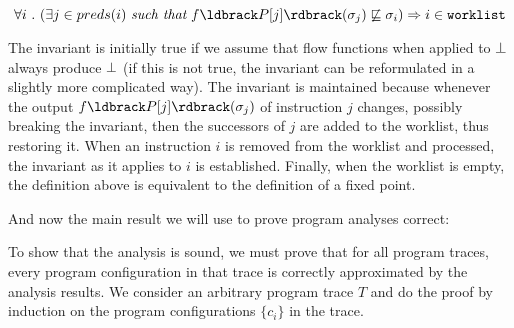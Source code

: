 \documentclass[11pt]{article}
\begin{document}
\[
\forall i ~.~ (\exists j \in preds(i) ~\textit{such that}~f\parg{P[j]}(\sigma_j) \not\alap \sigma_i) \Rightarrow i \in \texttt{worklist}
\]

The invariant is initially true if we assume that flow functions when applied to $\bot$ always produce $\bot$ (if this is not true, the invariant can be reformulated in a slightly more complicated way).  The invariant is maintained because whenever the output $f\parg{P[j]}(\sigma_j)$ of instruction $j$ changes, possibly breaking the invariant, then the successors of $j$ are added to the worklist, thus restoring it.  When an instruction $i$ is removed from the worklist and processed, the invariant as it applies to $i$ is established.  Finally, when the worklist is empty, the definition above is equivalent to the definition of a fixed point.

\vspace{1em}

\noindent And now the main result we will use to prove program analyses correct:


\proof To show that the analysis is sound, we must prove that for all program traces, every program configuration in that trace is correctly approximated by the analysis results.  We consider an arbitrary program trace $T$ and do the proof by induction on the program configurations $\{ c_i \}$ in the trace.\\[1ex]
\end{document}
